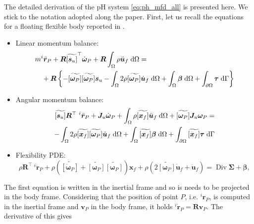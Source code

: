 \documentclass{svjour3}                     %
\DeclareMathOperator*{\Div}{Div}
\newcommand{\crmat}[1]{\ensuremath{\widetilde{\left[#1\right]}}}
\begin{document}
	The detailed derivation of the pH system \eqref{eq:ph_mfd_all} is presented here. We stick to the notation adopted along the paper. First, let us recall the equations for a floating flexible body reported in \cite{MB_Daepde,simeon2013computational}.
	\begin{itemize}
		\item Linear momentum balance:
		\begin{equation}
		\label{eq:rig_tr3}
		\begin{split}
		&m ^{i}\ddot{\bm{r}}_P + \bm{R} \crmat{\bm{s}_u}^\top \dot{\bm{\omega}}_P  + \bm{R} \int_{\Omega} \rho \ddot{\bm{u}}_f \d{\Omega} = \\
		&\quad + \bm{R} \left\{ -\crmat{\bm{\omega}_P} \crmat{\bm{\omega}_P} \bm{s}_u -  \int_{\Omega} 2 \rho \crmat{\bm{\omega}_P} \dot{\bm{u}}_f \d{\Omega} +  \int_{\Omega} \bm\beta \d{\Omega} +  \int_{\partial \Omega} \bm\tau \d{\Gamma}  \right\} 
		\end{split}
		\end{equation}
		\item Angular momentum balance:
		\begin{equation}
		\label{eq:rig_rot3}
		\begin{split}
		\crmat{\bm{s}_u} {\bm{R}^{\top}} \ ^{i}\ddot{\bm{r}}_P + \bm{J}_u \dot{\bm\omega}_P + \int_{\Omega} \rho \crmat{\bm{x}_f} \ddot{\bm{u}}_f \d{\Omega} + \crmat{\bm{\omega}_P} \bm{J}_u \bm{\omega}_P = \\ 
		- \int_{\Omega} 2\rho \crmat{\bm{x}_f} \crmat{\bm\omega_P} \dot{\bm{u}}_f \d{\Omega} + \int_{\Omega}\crmat{\bm{x}_f} \bm\beta \d{\Omega} + \int_{\partial \Omega}\crmat{\bm{x}_f} \bm\tau \d{\Gamma} \\
		\end{split}
		\end{equation}
		\item Flexibility PDE:
		\begin{equation}
		\label{eq:flex3}
		\rho  {\bm{R}^{\top}} \ ^{i}\ddot{\bm{r}}_P + \rho (\crmat{\dot{\bm\omega}_P} + \crmat{\bm{\omega}_P}\crmat{\bm{\omega}_P})\bm{x}_f + \rho (2 \crmat{\bm{\omega}_P} \dot{\bm{u}}_f + \ddot{\bm{u}}_f) = \Div{\bm\Sigma} + \bm\beta,
		\end{equation}
	\end{itemize}
	The first equation is written in the inertial frame and so is needs to be projected in the body frame. Considering that the position of point $P$, i.e. $^{i}{\bm{r}}_P$, is computed in the inertial frame and $\bm{v}_P$ in the body frame, it holds $^{i}\dot{\bm{r}}_P = \bm{R} \bm{v}_P$. The derivative of this gives
\end{document}
